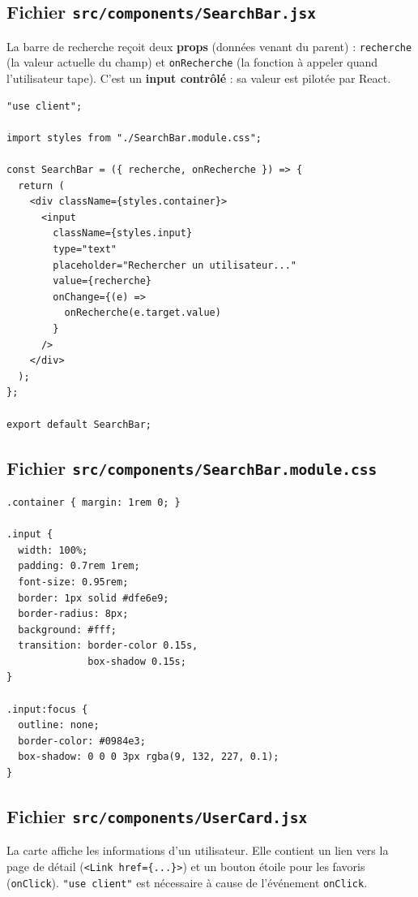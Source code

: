\documentclass[11pt,a4paper]{article}
\begin{document}
\subsection{Fichier \texttt{src/components/SearchBar.jsx}}

La barre de recherche reçoit deux \textbf{props} (données venant du parent) : \texttt{recherche} (la valeur actuelle du champ) et \texttt{onRecherche} (la fonction à appeler quand l'utilisateur tape). C'est un \textbf{input contrôlé} : sa valeur est pilotée par React.

\begin{lstlisting}
"use client";

import styles from "./SearchBar.module.css";

const SearchBar = ({ recherche, onRecherche }) => {
  return (
    <div className={styles.container}>
      <input
        className={styles.input}
        type="text"
        placeholder="Rechercher un utilisateur..."
        value={recherche}
        onChange={(e) =>
          onRecherche(e.target.value)
        }
      />
    </div>
  );
};

export default SearchBar;
\end{lstlisting}

\subsection{Fichier \texttt{src/components/SearchBar.module.css}}

\begin{lstlisting}[style=css]
.container { margin: 1rem 0; }

.input {
  width: 100%;
  padding: 0.7rem 1rem;
  font-size: 0.95rem;
  border: 1px solid #dfe6e9;
  border-radius: 8px;
  background: #fff;
  transition: border-color 0.15s,
              box-shadow 0.15s;
}

.input:focus {
  outline: none;
  border-color: #0984e3;
  box-shadow: 0 0 0 3px rgba(9, 132, 227, 0.1);
}
\end{lstlisting}

\subsection{Fichier \texttt{src/components/UserCard.jsx}}

La carte affiche les informations d'un utilisateur. Elle contient un lien vers la page de détail (\texttt{<Link href=\{...\}>}) et un bouton étoile pour les favoris (\texttt{onClick}). \texttt{"use client"} est nécessaire à cause de l'événement \texttt{onClick}.
\end{document}
